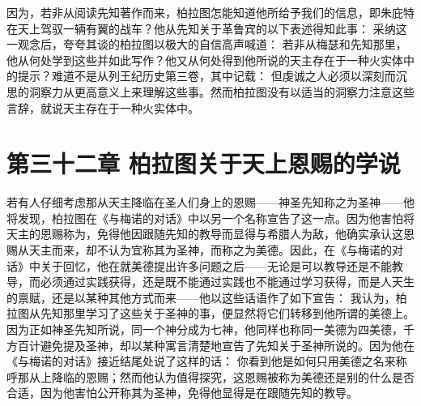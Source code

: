因为，若非从阅读先知著作而来，柏拉图怎能知道他所给予我们的信息，即朱庇特在天上驾驭一辆有翼的战车？他从先知关于革鲁宾的以下表述得知此事： 采纳这一观念后，夸夸其谈的柏拉图以极大的自信高声喊道： 若非从梅瑟和先知那里，他从何处学到这些并如此写作？他又从何处得到他所说的天主存在于一种火实体中的提示？难道不是从列王纪历史第三卷，其中记载： 但虔诚之人必须以深刻而沉思的洞察力从更高意义上来理解这些事。然而柏拉图没有以适当的洞察力注意这些言辞，就说天主存在于一种火实体中。\par


\section{第三十二章 柏拉图关于天上恩赐的学说}

若有人仔细考虑那从天主降临在圣人们身上的恩赐——神圣先知称之为圣神——他将发现，柏拉图在《与梅诺的对话》中以另一个名称宣告了这一点。因为他害怕将天主的恩赐称为，免得他因跟随先知的教导而显得与希腊人为敌，他确实承认这恩赐从天主而来，却不认为宜称其为圣神，而称之为美德。因此，在《与梅诺的对话》中关于回忆，他在就美德提出许多问题之后——无论是可以教导还是不能教导，而必须通过实践获得，还是既不能通过实践也不能通过学习获得，而是人天生的禀赋，还是以某种其他方式而来——他以这些话语作了如下宣告： 我认为，柏拉图从先知那里学习了这些关于圣神的事，便显然将它们转移到他所谓的美德上。因为正如神圣先知所说，同一个神分成为七神，他同样也称同一美德为四美德，千方百计避免提及圣神，却以某种寓言清楚地宣告了先知关于圣神所说的。因为他在《与梅诺的对话》接近结尾处说了这样的话： 你看到他是如何只用美德之名来称呼那从上降临的恩赐；然而他认为值得探究，这恩赐被称为美德还是别的什么是否合适，因为他害怕公开称其为圣神，免得他显得是在跟随先知的教导。\par


